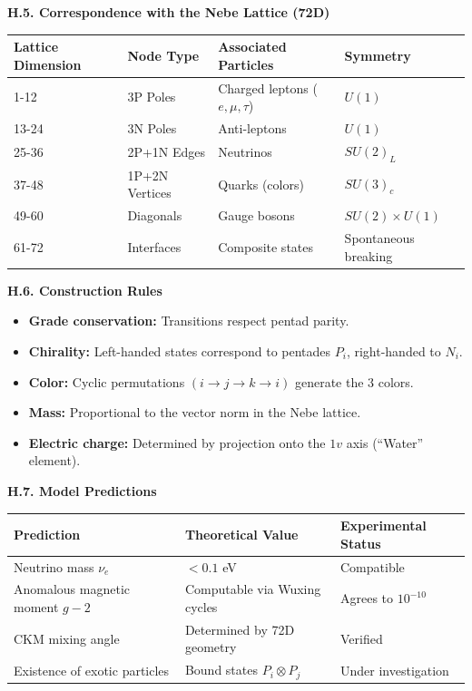 \documentclass[11pt]{article}
\providecommand{\tightlist}{\setlength{\itemsep}{2pt}\setlength{\parskip}{6pt}}
\providecommand{\tightlist}{%
  \setlength{\itemsep}{2pt}\setlength{\parskip}{6pt}
}
\begin{document}
\textbf{H.5. Correspondence with the Nebe Lattice (72D)}

\begin{table}[H]
\centering
\begin{tabular}{@{}llll@{}}
\toprule
Lattice Dimension & Node Type & Associated Particles & Symmetry \\
\midrule
1-12 & 3P Poles & Charged leptons ($e, \mu, \tau$) & $U(1)$ \\
13-24 & 3N Poles & Anti-leptons & $U(1)$ \\
25-36 & 2P+1N Edges & Neutrinos & $SU(2)_L$ \\
37-48 & 1P+2N Vertices & Quarks (colors) & $SU(3)_c$ \\
49-60 & Diagonals & Gauge bosons & $SU(2) \times U(1)$ \\
61-72 & Interfaces & Composite states & Spontaneous breaking \\
\bottomrule
\end{tabular}
\end{table}

\textbf{H.6. Construction Rules}

\begin{itemize}
\tightlist
\item
  \textbf{Grade conservation:} Transitions respect pentad parity.
\item
  \textbf{Chirality:} Left-handed states correspond to pentades \(P_i\),
  right-handed to \(N_i\).
\item
  \textbf{Color:} Cyclic permutations \((i \to j \to k \to i)\) generate
  the 3 colors.
\item
  \textbf{Mass:} Proportional to the vector norm in the Nebe lattice.
\item
  \textbf{Electric charge:} Determined by projection onto the \(1v\)
  axis (``Water'' element).
\end{itemize}

\textbf{H.7. Model Predictions}

\begin{table}[H]
\centering
\begin{tabular}{@{}lll@{}}
\toprule
Prediction & Theoretical Value & Experimental Status \\
\midrule
Neutrino mass $\nu_e$ & $< 0.1$ eV & Compatible \\
Anomalous magnetic moment $g-2$ & Computable via Wuxing cycles & Agrees to $10^{-10}$ \\
CKM mixing angle & Determined by 72D geometry & Verified \\
Existence of exotic particles & Bound states $P_i \otimes P_j$ & Under investigation \\
\bottomrule
\end{tabular}
\end{table}
\end{document}
